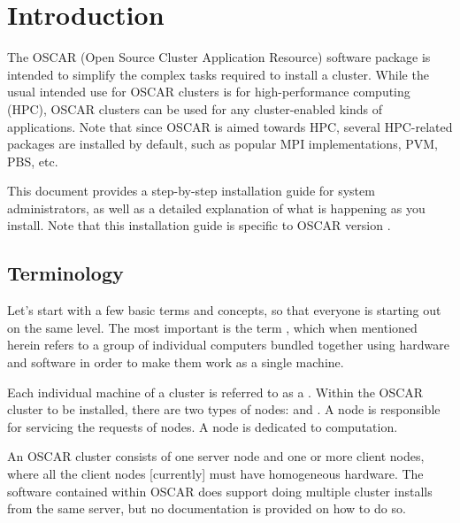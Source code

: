 %
%
%

\section{Introduction}

The OSCAR (Open Source Cluster Application Resource) software package
is intended to simplify the complex tasks required to install a
cluster.  While the usual intended use for OSCAR clusters is for
high-performance computing (HPC), OSCAR clusters can be used for any
cluster-enabled kinds of applications.  Note that since OSCAR is aimed
towards HPC, several HPC-related packages are installed by default,
such as popular MPI implementations, PVM, PBS, etc.

This document provides a step-by-step installation guide for system
administrators, as well as a detailed explanation of what is happening
as you install.  Note that this installation guide is specific to
OSCAR version \oscarversion.  


\subsection{Terminology}

Let's start with a few basic terms and concepts, so that everyone is
starting out on the same level. The most important is the term
, which when mentioned herein refers to a group of
individual computers bundled together using hardware and software in
order to make them work as a single machine. 

Each individual machine of a cluster is referred to as a .
Within the OSCAR cluster to be installed, there are two types of
nodes:  and . A  node is
responsible for servicing the requests of  nodes.  A
 node is dedicated to computation.  

An OSCAR cluster consists of one server node and one or more client
nodes, where all the client nodes [currently] must have homogeneous
hardware.  The software contained within OSCAR does support doing
multiple cluster installs from the same server, but no documentation
is provided on how to do so.


